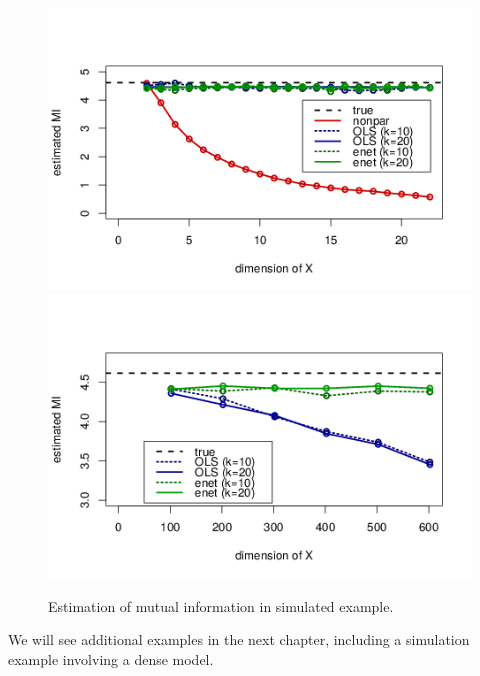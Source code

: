 \begin{figure}
\centering
\includegraphics[scale = 0.8]{Figures/sim2a_fig1_edited.png}
\includegraphics[scale = 0.8]{Figures/sim2a_fig3_edited.png}
\caption{Estimation of mutual information in simulated example.}
\label{fig:ch4_simulation}
\end{figure}

We will see additional examples in the next chapter, including a
simulation example involving a dense model.
